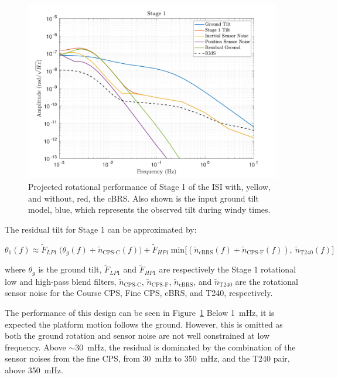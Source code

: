 \documentclass [12pt, proquest]{uwthesis}[2019]
\begin{document}
\begin{figure}[!h]
\begin{center}
\includegraphics[width=\textwidth]{cBRS_Model_ST1RX.pdf}
\caption[Projected rotational performance of Stage 1 of the ISI]{Projected rotational performance of Stage 1 of the ISI with, yellow, and without, red, the cBRS. Also shown is the input ground tilt model, blue, which represents the observed tilt during windy times.}
\label{cBRS1R}
\end{center}
\end{figure}

The residual tilt for Stage 1 can be approximated by:

\begin{equation}
\theta_1(f)\approx \tilde{F}_{LP1}\ \big(\theta_g(f)+\tilde{n}_\text{CPS-C}(f)\big)+\tilde{F}_{HP1}\ \text{min}\big[(\tilde{n}_\text{cBRS}(f)+\tilde{n}_\text{CPS-F}(f)),\ \tilde{n}_\text{T240}(f)\big]
\end{equation}

where $\theta_g$ is the ground tilt, $\tilde{F}_{LP1}$ and $\tilde{F}_{HP1}$ are respectively the Stage 1 rotational low and high-pass blend filters, $\tilde{n}_\text{CPS-C}$, $\tilde{n}_\text{CPS-F}$, $\tilde{n}_\text{cBRS}$, and $\tilde{n}_\text{T240}$ are the rotational sensor noise for the Course CPS, Fine CPS, cBRS, and T240, respectively.

The performance of this design can be seen in Figure~\ref{cBRS1R} Below 1~mHz, it is expected the platform motion follows the ground. However, this is omitted as both the ground rotation and sensor noise are not well constrained at low frequency. Above $\sim$30~mHz, the residual is dominated by the combination of the sensor noises from the fine CPS, from 30~mHz to 350~mHz, and the T240 pair, above 350~mHz.
\end{document}
